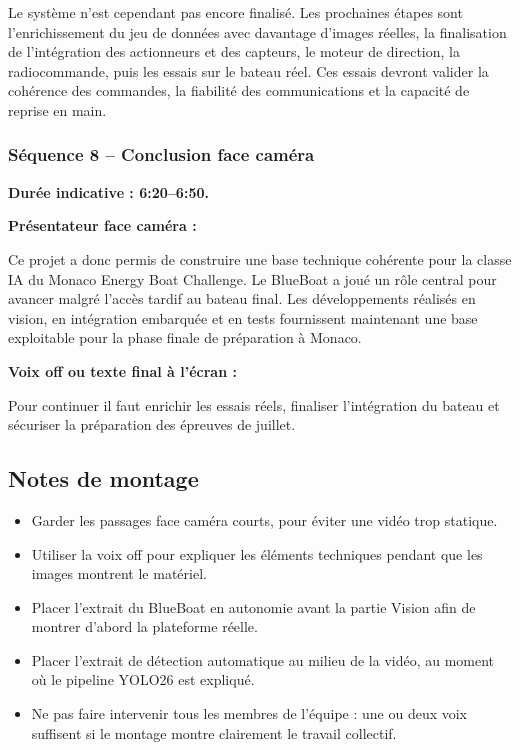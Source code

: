 \documentclass[11pt,letterpaper]{article}
\begin{document}
Le système n'est cependant pas encore finalisé. Les prochaines étapes sont l'enrichissement du jeu de données avec davantage d'images réelles, la finalisation de l'intégration des actionneurs et des capteurs, le moteur de direction, la radiocommande, puis les essais sur le bateau réel. Ces essais devront valider la cohérence des commandes, la fiabilité des communications et la capacité de reprise en main.

\subsubsection*{Séquence 8 -- Conclusion face caméra}
\textbf{Durée indicative : 6:20--6:50.}

\textbf{Présentateur face caméra :}

Ce projet a donc permis de construire une base technique cohérente pour la classe IA du Monaco Energy Boat Challenge. Le BlueBoat a joué un rôle central pour avancer malgré l'accès tardif au bateau final. Les développements réalisés en vision, en intégration embarquée et en tests fournissent maintenant une base exploitable pour la phase finale de préparation à Monaco.

\textbf{Voix off ou texte final à l'écran :}

Pour continuer il faut enrichir les essais réels, finaliser l'intégration du bateau et sécuriser la préparation des épreuves de juillet.

\subsection{Notes de montage}
\begin{itemize}
    \item Garder les passages face caméra courts, pour éviter une vidéo trop statique.
    \item Utiliser la voix off pour expliquer les éléments techniques pendant que les images montrent le matériel.
    \item Placer l'extrait du BlueBoat en autonomie avant la partie Vision afin de montrer d'abord la plateforme réelle.
    \item Placer l'extrait de détection automatique au milieu de la vidéo, au moment où le pipeline YOLO26 est expliqué.
    \item Ne pas faire intervenir tous les membres de l'équipe : une ou deux voix suffisent si le montage montre clairement le travail collectif.
\end{itemize}
\end{document}
